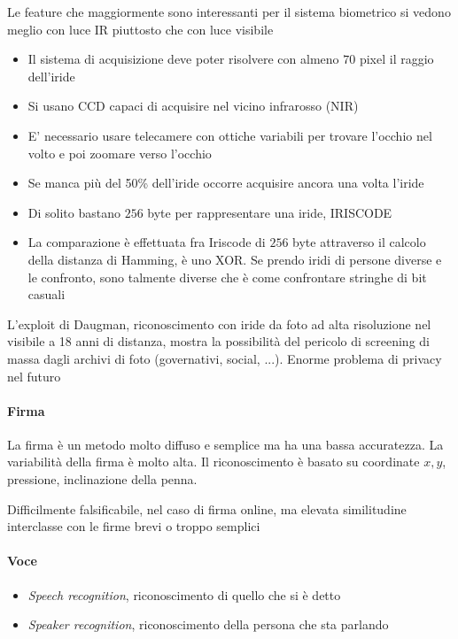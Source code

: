 Le feature che maggiormente sono interessanti per il sistema biometrico si vedono meglio con luce IR piuttosto che con luce visibile

\begin{itemize}
    \item Il sistema di acquisizione deve poter risolvere con almeno $70$ pixel il raggio dell’iride
    \item Si usano CCD capaci di acquisire nel vicino infrarosso (NIR)
    \item E’ necessario usare telecamere con ottiche variabili per trovare l’occhio nel volto e poi zoomare verso l’occhio
    \item Se manca più del 50\% dell’iride occorre acquisire ancora una volta l’iride
    \item Di solito bastano $256$ byte per rappresentare una iride, IRISCODE
    \item La comparazione è effettuata fra Iriscode di $256$ byte attraverso il calcolo della distanza di Hamming, è uno XOR. Se prendo iridi di persone diverse e le confronto, sono talmente diverse che è come confrontare stringhe di bit casuali
\end{itemize}

L’exploit di Daugman, riconoscimento con iride da foto ad alta risoluzione nel visibile a 18 anni di distanza, mostra la possibilità del pericolo di screening di massa dagli archivi di foto (governativi, social, ...). Enorme problema di privacy nel futuro

\paragraph{Firma}
La firma è un metodo molto diffuso e semplice ma ha una bassa accuratezza. La variabilità della firma è molto alta. Il riconoscimento è basato su coordinate $x,y$, pressione, inclinazione della penna.

Difficilmente falsificabile, nel caso di firma online, ma elevata
similitudine interclasse con le firme brevi o troppo semplici

\paragraph{Voce}
\begin{itemize}
    \item \textit{Speech recognition}, riconoscimento di quello che si è detto
    \item \textit{Speaker recognition}, riconoscimento della persona che sta parlando
\end{itemize}

